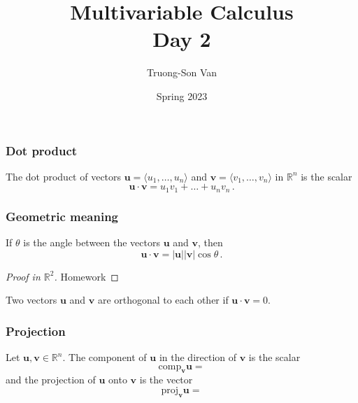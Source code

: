 \documentclass[aspectratio=169]{beamer}
\title{ Multivariable Calculus \\ Day 2}
\institute{Fulbright University Vietnam}
\author{Truong-Son Van}
\date{Spring 2023}
\newcommand{\vectorproj}[2][]{\mathrm{proj}_{\vect{#1}}\vect{#2}}
\newcommand{\vectorcomp}[2][]{\mathrm{comp}_{\vect{#1}}\vect{#2}}
\newcommand{\vect}{\mathbf}
\begin{document}
\maketitle
\begin{frame}
    \frametitle{Dot product}
    \begin{definition}
The dot product of vectors $\textbf{u} = \langle u_1, \dots, u_n \rangle$
and $\textbf{v} = \langle v_1, \dots, v_n \rangle$ in $\mathbb{R}^n$ is the
scalar
\begin{equation*}
    \textbf{u} \cdot \textbf{v} = u_1 v_1 +\dots + u_n v_n \,.
\end{equation*}
    \end{definition}
\end{frame}

\begin{frame}
    \frametitle{Geometric meaning}
    \begin{theorem}
If $\theta$ is the angle between the vectors $\textbf{u}$ and $\textbf{v}$, then
   \begin{equation*}
        \textbf{u}\cdot \textbf{v} = |\textbf{u}|| \textbf{v}| \cos \theta \,.
   \end{equation*}
    \end{theorem}
    \pause

    \begin{proof}[Proof in $\mathbb{R}^2$]
        Homework
    \end{proof}

    \pause
    \begin{corollary}
Two vectors $\textbf{u}$ and $\textbf{v}$ are orthogonal to each other
if $\textbf{u} \cdot \textbf{v} = 0$.
    \end{corollary}
\end{frame}

\begin{frame}
    \frametitle{Projection}
Let $\textbf{u}, \textbf{v}\in \mathbb{R}^n$. The component of $\textbf{u}$ 
in the direction of $\textbf{v}$ is the scalar
\begin{equation*}
\vectorcomp[v]{u} =  
\end{equation*}
and the projection of $\vect{u}$ onto $\vect{v}$ is the vector
\begin{equation*}
    \vectorproj[v]{u}  =
\end{equation*}
\end{frame}
\end{document}
